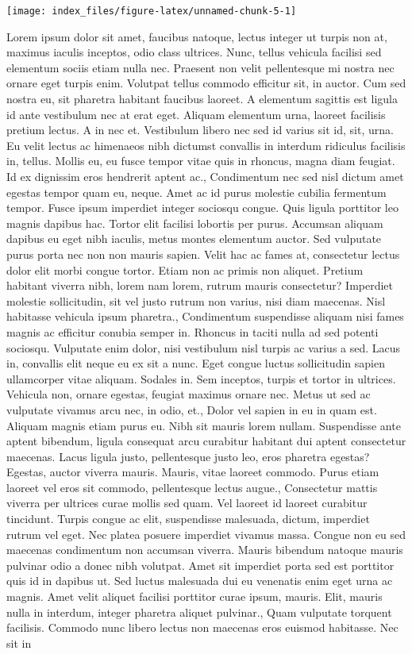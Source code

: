 \documentclass{source/tex/templates/maththesis}
\begin{document}
\begin{center}\texttt{[image: index\_files/figure-latex/unnamed-chunk-5-1]} \end{center}

Lorem ipsum dolor sit amet, faucibus natoque, lectus integer ut turpis non at, maximus iaculis inceptos, odio class ultrices. Nunc, tellus vehicula facilisi sed elementum sociis etiam nulla nec. Praesent non velit pellentesque mi nostra nec ornare eget turpis enim. Volutpat tellus commodo efficitur sit, in auctor. Cum sed nostra eu, sit pharetra habitant faucibus laoreet. A elementum sagittis est ligula id ante vestibulum nec at erat eget. Aliquam elementum urna, laoreet facilisis pretium lectus. A in nec et. Vestibulum libero nec sed id varius sit id, sit, urna. Eu velit lectus ac himenaeos nibh dictumst convallis in interdum ridiculus facilisis in, tellus. Mollis eu, eu fusce tempor vitae quis in rhoncus, magna diam feugiat. Id ex dignissim eros hendrerit aptent ac., Condimentum nec sed nisl dictum amet egestas tempor quam eu, neque. Amet ac id purus molestie cubilia fermentum tempor. Fusce ipsum imperdiet integer sociosqu congue. Quis ligula porttitor leo magnis dapibus hac. Tortor elit facilisi lobortis per purus. Accumsan aliquam dapibus eu eget nibh iaculis, metus montes elementum auctor. Sed vulputate purus porta nec non non mauris sapien. Velit hac ac fames at, consectetur lectus dolor elit morbi congue tortor. Etiam non ac primis non aliquet. Pretium habitant viverra nibh, lorem nam lorem, rutrum mauris consectetur? Imperdiet molestie sollicitudin, sit vel justo rutrum non varius, nisi diam maecenas. Nisl habitasse vehicula ipsum pharetra., Condimentum suspendisse aliquam nisi fames magnis ac efficitur conubia semper in. Rhoncus in taciti nulla ad sed potenti sociosqu. Vulputate enim dolor, nisi vestibulum nisl turpis ac varius a sed. Lacus in, convallis elit neque eu ex sit a nunc. Eget congue luctus sollicitudin sapien ullamcorper vitae aliquam. Sodales in. Sem inceptos, turpis et tortor in ultrices. Vehicula non, ornare egestas, feugiat maximus ornare nec. Metus ut sed ac vulputate vivamus arcu nec, in odio, et., Dolor vel sapien in eu in quam est. Aliquam magnis etiam purus eu. Nibh sit mauris lorem nullam. Suspendisse ante aptent bibendum, ligula consequat arcu curabitur habitant dui aptent consectetur maecenas. Lacus ligula justo, pellentesque justo leo, eros pharetra egestas? Egestas, auctor viverra mauris. Mauris, vitae laoreet commodo. Purus etiam laoreet vel eros sit commodo, pellentesque lectus augue., Consectetur mattis viverra per ultrices curae mollis sed quam. Vel laoreet id laoreet curabitur tincidunt. Turpis congue ac elit, suspendisse malesuada, dictum, imperdiet rutrum vel eget. Nec platea posuere imperdiet vivamus massa. Congue non eu sed maecenas condimentum non accumsan viverra. Mauris bibendum natoque mauris pulvinar odio a donec nibh volutpat. Amet sit imperdiet porta sed est porttitor quis id in dapibus ut. Sed luctus malesuada dui eu venenatis enim eget urna ac magnis. Amet velit aliquet facilisi porttitor curae ipsum, mauris. Elit, mauris nulla in interdum, integer pharetra aliquet pulvinar., Quam vulputate torquent facilisis. Commodo nunc libero lectus non maecenas eros euismod habitasse. Nec sit in 
\end{document}
